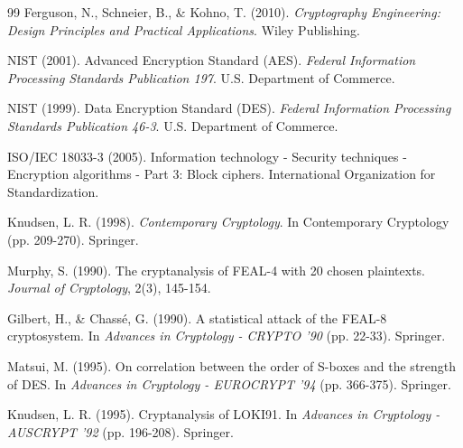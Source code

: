 \documentclass[12pt,a4paper]{article}
\theoremstyle{definition}
\begin{document}
\begin{thebibliography}{99}
Ferguson, N., Schneier, B., \& Kohno, T. (2010).
\newblock \textit{Cryptography Engineering: Design Principles and Practical Applications}.
\newblock Wiley Publishing.

NIST (2001).
\newblock Advanced Encryption Standard (AES).
\newblock \textit{Federal Information Processing Standards Publication 197}.
\newblock U.S. Department of Commerce.

NIST (1999).
\newblock Data Encryption Standard (DES).
\newblock \textit{Federal Information Processing Standards Publication 46-3}.
\newblock U.S. Department of Commerce.

ISO/IEC 18033-3 (2005).
\newblock Information technology - Security techniques - Encryption algorithms - Part 3: Block ciphers.
\newblock International Organization for Standardization.

Knudsen, L. R. (1998).
\newblock \textit{Contemporary Cryptology}.
\newblock In Contemporary Cryptology (pp. 209-270). Springer.

Murphy, S. (1990).
\newblock The cryptanalysis of FEAL-4 with 20 chosen plaintexts.
\newblock \textit{Journal of Cryptology}, 2(3), 145-154.

Gilbert, H., \& Chassé, G. (1990).
\newblock A statistical attack of the FEAL-8 cryptosystem.
\newblock In \textit{Advances in Cryptology - CRYPTO '90} (pp. 22-33). Springer.

Matsui, M. (1995).
\newblock On correlation between the order of S-boxes and the strength of DES.
\newblock In \textit{Advances in Cryptology - EUROCRYPT '94} (pp. 366-375). Springer.

Knudsen, L. R. (1995).
\newblock Cryptanalysis of LOKI91.
\newblock In \textit{Advances in Cryptology - AUSCRYPT '92} (pp. 196-208). Springer.

\end{thebibliography}
\end{document}
